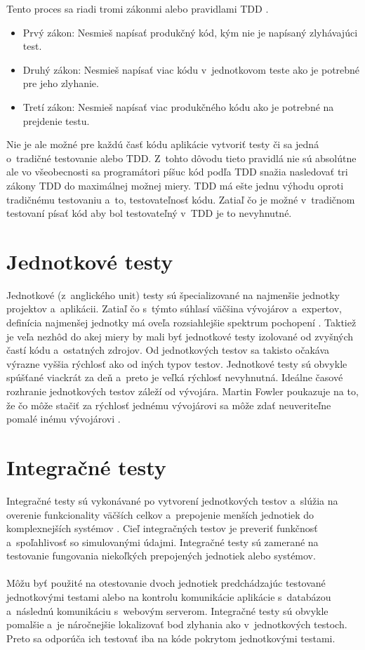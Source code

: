 \documentclass[
  printed, %
  table,   %
oneside,
  nolof,     %
  nolot,     %
]{fithesis3}
\begin{document}
Tento proces sa riadi tromi zákonmi alebo pravidlami TDD \cite{cleanCode}.
\begin{itemize}
	\item Prvý zákon: Nesmieš napísať produkčný kód, kým nie je napísaný zlyhávajúci test.
	\item Druhý zákon: Nesmieš napísať viac kódu v~jednotkovom teste ako je potrebné pre jeho zlyhanie.
	\item Tretí zákon: Nesmieš napísať viac produkčného kódu ako je potrebné na prejdenie testu. 
\end{itemize} 
Nie je ale možné pre každú časť kódu aplikácie vytvoriť testy či sa jedná o~tradičné testovanie alebo TDD. Z~tohto dôvodu tieto pravidlá nie sú absolútne ale vo všeobecnosti sa programátori píšuc kód podľa TDD snažia nasledovať tri zákony TDD do maximálnej možnej miery.
TDD má ešte jednu výhodu oproti tradičnému testovaniu a~to, testovateľnosť kódu. Zatiaľ čo je možné v~tradičnom testovaní písať kód aby bol testovateľný v~TDD je to nevyhnutné. 

\section{Jednotkové testy}
Jednotkové (z~anglického unit) testy sú špecializované na najmenšie jednotky projektov a~aplikácii. Zatiaľ čo s~týmto súhlasí väčšina vývojárov a~expertov, definícia najmenšej jednotky má oveľa rozsiahlejšie spektrum pochopení \cite{codeMaintability}\cite{effectiveSoftwareTesting}. Taktiež je veľa nezhôd do akej miery by mali byť jednotkové testy izolované od zvyšných častí kódu a~ostatných zdrojov. Od jednotkových testov sa takisto očakáva výrazne vyššia rýchlosť ako od iných typov testov. Jednotkové testy sú obvykle spúšťané viackrát za deň a~preto je veľká rýchlosť nevyhnutná. Ideálne časové rozhranie jednotkových testov záleží od vývojára. Martin Fowler poukazuje na to, že čo môže stačiť za rýchlosť jednému vývojárovi sa môže zdať neuveriteľne pomalé inému vývojárovi \cite{unitTest}.
\section{Integračné testy}
Integračné testy sú vykonávané po vytvorení jednotkových testov a~slúžia na overenie funkcionality väčších celkov a~prepojenie menších jednotiek do komplexnejších systémov \cite{testSeparation}. Cieľ integračných testov je preveriť funkčnosť a~spoľahlivosť so simulovanými údajmi. Integračné testy sú zamerané na testovanie fungovania niekoľkých prepojených jednotiek alebo systémov.\paragraph{}
Môžu byť použité na otestovanie dvoch jednotiek predchádzajúc testované jednotkovými testami alebo na kontrolu komunikácie aplikácie s~databázou a~následnú komunikáciu s~webovým serverom. Integračné testy sú obvykle pomalšie a~je náročnejšie lokalizovať bod zlyhania ako v~jednotkových  testoch. Preto sa odporúča ich testovať iba na kóde pokrytom jednotkovými testami.
\end{document}
